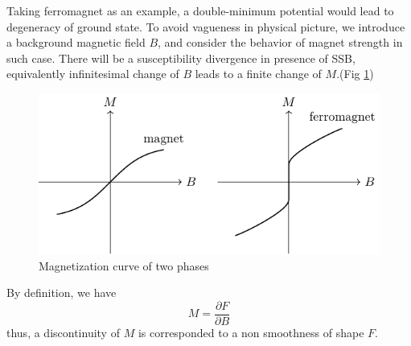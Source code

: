 Taking ferromagnet as an example, a double-minimum potential would lead to degeneracy of ground state. To avoid vagueness in physical picture, we introduce a background magnetic field $B$, and consider the behavior of magnet strength in such case. 
There will be a susceptibility divergence in presence of SSB, equivalently infinitesimal change of $B$ leads to a finite change of $M$.(Fig \ref{magnetization of two phases})
\begin{figure}
    \centering
    \includegraphics{figures/phase_transition_of_ferromagnet.pdf}
    \caption{Magnetization curve of two phases}
    \label{magnetization of two phases}
\end{figure}

By definition, we have
\begin{equation}
  M = \frac{\partial F}{\partial B}
\end{equation}
thus, a discontinuity of $M$ is corresponded to a non smoothness of shape $F$.

